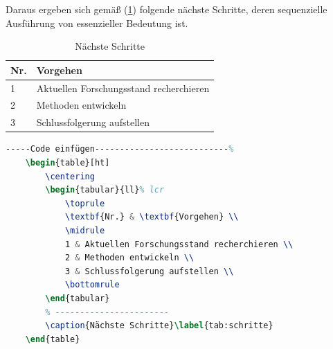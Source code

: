Daraus ergeben sich gemäß (\ref{tab:schritte}) folgende nächste Schritte, deren sequenzielle Ausführung von essenzieller Bedeutung ist.

\begin{table}[ht]
	\centering
	\begin{tabular}{ll}%
		\toprule
		\textbf{Nr.} & \textbf{Vorgehen} \\
		\midrule
		1 & Aktuellen Forschungsstand recherchieren \\
		2 & Methoden entwickeln \\
		3 & Schlussfolgerung aufstellen \\
		\bottomrule
	\end{tabular}
	\caption{Nächste Schritte}\label{tab:schritte}
\end{table}

\begin{lstlisting}[language=TeX,caption={Nächste Schritte},label={code:schritte}% C, TeX, Bash, Python
]-----Code einfügen---------------------------%
	\begin{table}[ht]
		\centering
		\begin{tabular}{ll}% lcr
			\toprule
			\textbf{Nr.} & \textbf{Vorgehen} \\
			\midrule
			1 & Aktuellen Forschungsstand recherchieren \\
			2 & Methoden entwickeln \\
			3 & Schlussfolgerung aufstellen \\
			\bottomrule
		\end{tabular}
		% -----------------------
		\caption{Nächste Schritte}\label{tab:schritte}
	\end{table}
\end{lstlisting}
